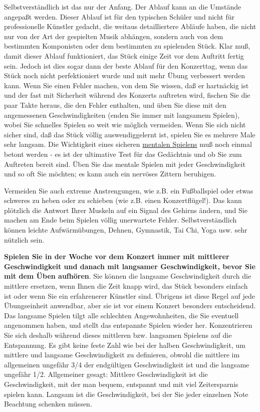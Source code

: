 Selbstverständlich ist das nur der Anfang.
Der Ablauf kann an die Umstände angepaßt werden.
Dieser Ablauf ist für den typischen Schüler und nicht für professionelle Künstler gedacht, die weitaus detailliertere Abläufe haben, die nicht nur von der Art der gespielten Musik abhängen, sondern auch von dem bestimmten Komponisten oder dem bestimmten zu spielenden Stück.
Klar muß, damit dieser Ablauf funktioniert, das Stück einige Zeit vor dem Auftritt fertig sein.
Jedoch ist dies sogar dann der beste Ablauf für den Konzerttag, wenn das Stück noch nicht perfektioniert wurde und mit mehr Übung verbessert werden kann.
Wenn Sie einen Fehler machen, von dem Sie wissen, daß er hartnäckig ist und der fast mit Sicherheit während des Konzerts auftreten wird, fischen Sie die paar Takte heraus, die den Fehler enthalten, und üben Sie diese mit den angemessenen Geschwindigkeiten (enden Sie immer mit langsamem Spielen), wobei Sie schnelles Spielen so weit wie möglich vermeiden.
Wenn Sie sich nicht sicher sind, daß das Stück völlig auswendiggelernt ist, spielen Sie es mehrere Male sehr langsam.
Die Wichtigkeit eines sicheren \hyperlink{c1ii12mental}{mentalen Spielens} muß noch einmal betont werden - es ist der ultimative Test für das Gedächtnis und ob Sie zum Auftreten bereit sind.
Üben Sie das mentale Spielen mit jeder Geschwindigkeit und so oft Sie möchten; es kann auch ein nervöses Zittern beruhigen.

Vermeiden Sie auch extreme Anstrengungen, wie z.B. ein Fußballspiel oder etwas schweres zu heben oder zu schieben (wie z.B. einen Konzertflügel!).
Das kann plötzlich die Antwort Ihrer Muskeln auf ein Signal des Gehirns ändern, und Sie machen am Ende beim Spielen völlig unerwartete Fehler.
Selbstverständlich können leichte Aufwärmübungen, Dehnen, Gymnastik, Tai Chi, Yoga usw. sehr nützlich sein.

\textbf{Spielen Sie in der Woche vor dem Konzert immer mit mittlerer Geschwindigkeit und danach mit langsamer Geschwindigkeit, bevor Sie mit dem Üben aufhören}.
Sie können die langsame Geschwindigkeit durch die mittlere ersetzen, wenn Ihnen die Zeit knapp wird, das Stück besonders einfach ist oder wenn Sie ein erfahrenerer Künstler sind.
Übrigens ist diese Regel auf jede Übungseinheit anwendbar, aber sie ist vor einem Konzert besonders entscheidend.
Das langsame Spielen tilgt alle schlechten Angewohnheiten, die Sie eventuell angenommen haben, und stellt das entspannte Spielen wieder her.
Konzentrieren Sie sich deshalb während dieses mittleren bzw. langsamen Spielens auf die Entspannung.
Es gibt keine feste Zahl wie bei der halben Geschwindigkeit, um mittlere und langsame Geschwindigkeit zu definieren, obwohl die mittlere im allgemeinen ungefähr 3/4 der endgültigen Geschwindigkeit ist und die langsame ungefähr 1/2.
Allgemeiner gesagt: Mittlere Geschwindigkeit ist die Geschwindigkeit, mit der man bequem, entspannt und mit viel Zeitersparnis spielen kann.
Langsam ist die Geschwindigkeit, bei der Sie jeder einzelnen Note Beachtung schenken müssen.

